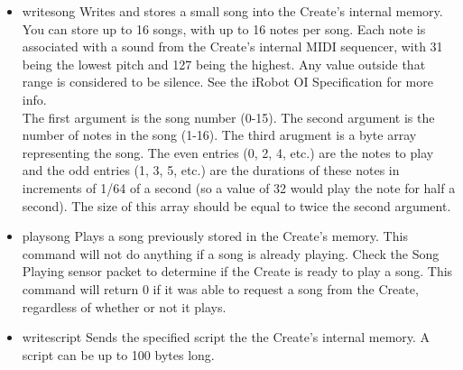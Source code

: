 \documentclass {article}
\begin{document}
\begin {itemize}
  \item {} {writesong}
        Writes and stores a small song into the Create's internal memory.  You can store up to 16
        songs, with up to 16 notes per song.  Each note is associated with a sound from the Create's
        internal MIDI sequencer, with 31 being the lowest pitch and 127 being the highest.  Any
        value outside that range is considered to be silence.  See the iRobot OI Specification for
        more info. \\
        The first argument is the song number (0-15).  The second argument is the number of notes in
        the song (1-16).  The third arugment is a byte array representing the song.  The even
        entries (0, 2, 4, etc.) are the notes to play and the odd entries (1, 3, 5, etc.) are the
        durations of these notes in increments of 1/64 of a second (so a value of 32 would play the
        note for half a second).  The size of this array should be equal to twice the second
        argument. \\
        \retnorm

  \item {} {playsong}
        Plays a song previously stored in the Create's memory.  This command will not do anything if
        a song is already playing.  Check the Song Playing sensor packet to determine if the Create
        is ready to play a song.  This command will return 0 if it was able to request a song from
        the Create, regardless of whether or not it plays. \\
        \retnorm
        
  \item {} {writescript}
         Sends the specified script the the Create's internal memory.  A script can be up to 100
         bytes long. \\
         \retnorm


\end{itemize}
\end{document}
